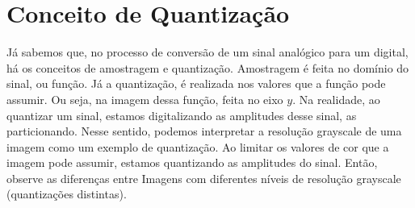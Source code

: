\documentclass[a4paper, 12pt]{article}
\begin{document}
\section{Conceito de Quantização}
Já sabemos que, no processo de conversão de um sinal analógico para um digital, há os conceitos de amostragem e quantização. Amostragem é 
feita no domínio do sinal, ou função. Já a quantização, é realizada nos valores que a função pode assumir. Ou seja, na imagem dessa função, feita no eixo 
$y$. Na realidade, ao quantizar um sinal, estamos digitalizando as amplitudes desse sinal, as particionando. Nesse sentido, podemos interpretar a resolução 
grayscale de uma imagem como um exemplo de quantização. Ao limitar os valores de cor que a imagem pode assumir, estamos quantizando as amplitudes do sinal.
Então, observe as diferenças entre Imagens com diferentes níveis de resolução grayscale (quantizações distintas).
\end{document}
